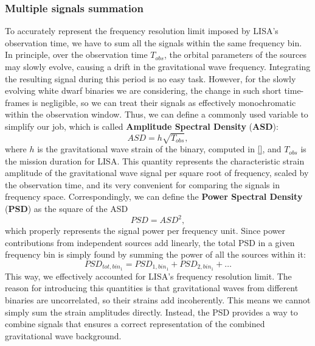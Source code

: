 \subsubsection{Multiple signals summation}
To accurately represent the frequency resolution limit imposed by LISA's observation time, we have to sum all the signals within the same frequency bin. 
In principle, over the observation time $T_{obs}$, the orbital parameters of the sources may slowly evolve, causing a drift in the gravitational wave frequency. 
Integrating the resulting signal during this period is no easy task.
However, for the slowly evolving white dwarf binaries we are considering, the change in such short time-frames is negligible, so we can treat their signals as effectively monochromatic within the observation window. 
Thus, we can define a commonly used variable to simplify our job, which is called  \textbf{Amplitude Spectral Density} (\textbf{ASD}):
\begin{equation}
    ASD = h\sqrt{T_{obs}},
    \label{eq: ASD definition}
\end{equation}
where $h$ is the gravitational wave strain of the binary, computed in \eqref{}, and $T_{obs}$ is the mission duration for LISA.
This quantity represents the characteristic strain amplitude of the gravitational wave signal per square root of frequency, scaled by the observation time, and its very convenient for comparing the signals in frequency space.
Correspondingly, we can define the \textbf{Power Spectral Density} (\textbf{PSD}) as the square of the ASD
\begin{equation}
    PSD = ASD^2,
    \label{eq: PSD definition}
\end{equation}
which properly represents the signal power per frequency unit.
Since power contributions from independent sources add linearly, the total PSD in a given frequency bin is simply found by summing the power of all the sources within it:
\begin{equation}
    PSD_{tot,bin_1} = PSD_{1,bin_1} + PSD_{2,bin_1} + \dots
    \label{eq: total PSD}
\end{equation}
This way, we effectively accounted for LISA's frequency resolution limit.
The reason for introducing this quantities is that gravitational waves from different binaries are uncorrelated, so their strains add incoherently. 
This means we cannot simply sum the strain amplitudes directly.
Instead, the PSD provides a way to combine signals that ensures a correct representation of the combined gravitational wave background.

